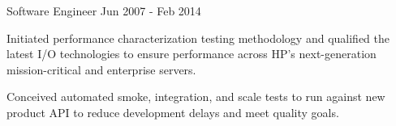 \begin{cventries}
  \cventry
    {Software Engineer}
    {}
    {}
    {Jun 2007 - Feb 2014}
    {}
    {
      \begin{cvitems}
        \item {
          Initiated performance characterization testing methodology and
          qualified the latest I/O technologies to ensure performance across
          HP’s next-generation mission-critical and enterprise servers.
        }
        \item {
          Conceived automated smoke, integration, and scale tests to run
          against new product API to reduce development delays and meet
          quality goals.
        }
      \end{cvitems}
    }

\end{cventries}
